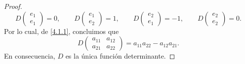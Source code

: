 \documentclass[12pt,a4paper]{book}
\begin{document}
\begin{proof}
\begin{equation*}
        D\begin{pmatrix}
            e_{1}\\e_{1}
        \end{pmatrix} = 0, \qquad D\begin{pmatrix}
            e_{1} \\ e_{2}
        \end{pmatrix} = 1, \qquad D\begin{pmatrix}
            e_{2}\\e_{1}
        \end{pmatrix} = - 1, \qquad D\begin{pmatrix}
            e_{2} \\ e_{2}
        \end{pmatrix} = 0.
        \end{equation*}
        Por lo cual, de \eqref{4.1.1}, concluimos que
        \begin{equation*}
        D \begin{pmatrix}
            a_{11} & a_{12}\\
            a_{21} & a_{22}
        \end{pmatrix} = a_{11}a_{22} - a_{12}a_{21}.
        \end{equation*}
        En consecuencia, $D$ es la única función determinante.
    \end{proof}
\end{document}
